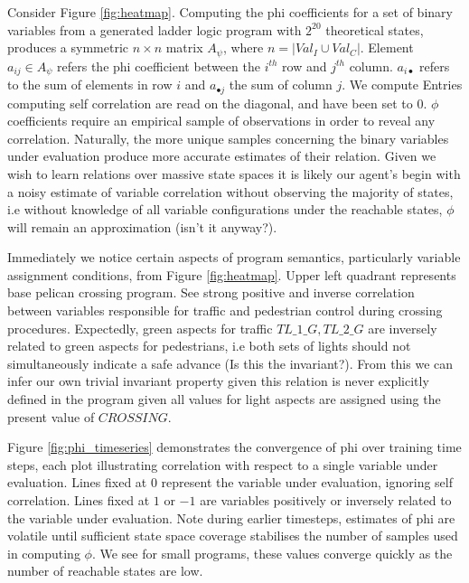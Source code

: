 \documentclass[runningheads]{llncs}
\begin{document}
Consider Figure \ref{fig:heatmap}. Computing the phi coefficients for a set of binary variables from a generated ladder logic program with $2^{20}$ theoretical states, produces a symmetric $n \times n$ matrix $A_{\psi}$, where $n = |Val_{I} \cup Val_{C}|$. Element $a_{ij} \in A_{\psi}$ refers the phi coefficient between the $i^{th}$ row and $j^{th}$ column. $a_{i\bullet}$ refers to the sum of elements in row $i$ and $a_{\bullet j}$ the sum of column $j$. We compute  Entries computing self correlation are read on the diagonal, and have been set to $0$. $\phi$ coefficients require an empirical sample of observations in order to reveal any correlation. Naturally, the more unique samples concerning the binary variables under evaluation produce more accurate estimates of their relation. Given we wish to learn relations over massive state spaces it is likely our agent's begin with a noisy estimate of variable correlation without observing the majority of states, i.e without knowledge of all variable configurations under the reachable states, $\phi$ will remain an approximation (isn't it anyway?). 

Immediately we notice certain aspects of program semantics, particularly variable assignment conditions, from Figure \ref{fig:heatmap}. Upper left quadrant represents base pelican crossing program. See strong positive and inverse correlation between variables responsible for traffic and pedestrian control during crossing procedures. Expectedly, green aspects for traffic $TL\_1\_G, TL\_2\_G$ are inversely related to green aspects for pedestrians, i.e both sets of lights should not simultaneously indicate a safe advance (Is this the invariant?). From this we can infer our own trivial invariant property given this relation is never explicitly defined in the program given all values for light aspects are assigned using the present value of $CROSSING$.

Figure \ref{fig:phi_timeseries} demonstrates the convergence of phi over training time steps, each plot illustrating correlation with respect to a single variable under evaluation. Lines fixed at $0$ represent the variable under evaluation, ignoring self correlation. Lines fixed at $1$ or $-1$ are variables positively or inversely related to the variable under evaluation. Note during earlier timesteps, estimates of phi are volatile until sufficient state space coverage stabilises the number of samples used in computing $\phi$. We see for small programs, these values converge quickly as the number of reachable states are low. 
\end{document}
